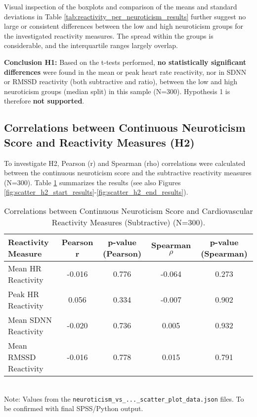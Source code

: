 \documentclass[11pt, a4paper]{report}
\begin{document}
Visual inspection of the boxplots and comparison of the means and standard deviations in Table \ref{tab:reactivity_per_neuroticism_results} further suggest no large or consistent differences between the low and high neuroticism groups for the investigated reactivity measures. The spread within the groups is considerable, and the interquartile ranges largely overlap.

\textbf{Conclusion H1:} Based on the t-tests performed, \textbf{no statistically significant differences} were found in the mean or peak heart rate reactivity, nor in SDNN or RMSSD reactivity (both subtractive and ratio), between the low and high neuroticism groups (median split) in this sample (N=300). Hypothesis 1 is therefore \textbf{not supported}.

\subsection{Correlations between Continuous Neuroticism Score and Reactivity Measures (H2)}
\label{subsec:results_h2_corr} %
To investigate H2, Pearson (r) and Spearman (rho) correlations were calculated between the continuous neuroticism score and the subtractive reactivity measures (N=300). Table \ref{tab:correlations_neuroticism_results} summarizes the results (see also Figures \ref{fig:scatter_h2_start_results}-\ref{fig:scatter_h2_end_results}).

\begin{table}[H]
\centering
\caption{Correlations between Continuous Neuroticism Score and Cardiovascular Reactivity Measures (Subtractive) (N=300).}
\label{tab:correlations_neuroticism_results}
\begin{tabular}{@{}l c c c c@{}}
\toprule
Reactivity Measure            & Pearson r & p-value (Pearson) & Spearman $\rho$ & p-value (Spearman) \\
\midrule
Mean HR Reactivity          & -0.016    & 0.776             & -0.064          & 0.273               \\
Peak HR Reactivity            & 0.056     & 0.334             & -0.007          & 0.902               \\
Mean SDNN Reactivity        & -0.020    & 0.736             & 0.005           & 0.932               \\
Mean RMSSD Reactivity       & -0.016    & 0.778             & 0.015           & 0.791               \\
\bottomrule
\end{tabular}
\\ \footnotesize{Note: Values from the \texttt{neuroticism\_vs\_...\_scatter\_plot\_data.json} files. To be confirmed with final SPSS/Python output.}
\end{table}
\end{document}
